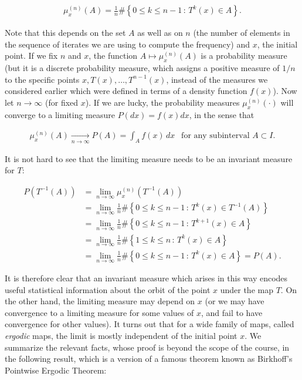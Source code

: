 \documentclass[11pt]{report}
\theoremstyle{plain}
\theoremstyle{definition}
\begin{document}
\begin{align*}
\mu_{x}^{(n)}(A) = \frac{1}{n} \# \left\{ 0\le k \le n-1\,:\, T^k(x) \in A \right\}.
\end{align*}

\noindent Note that this depends on the set $A$ as well as on
$n$ (the number of elements in the sequence of
iterates we are using to compute the frequency) and
$x$, the initial point. If we fix $n$ and $x$, the
function $A\mapsto \mu_x^{(n)}(A)$ is a probability
measure (but it is a discrete probability measure,
which assigns a positive measure of $1/n$ to the
specific points $x,T(x),\ldots,T^{n-1}(x)$, instead of
the measures we considered earlier which were defined
in terms of a density function $f(x)$). Now let
$n\to\infty$ (for fixed $x$). If we are lucky, the
probability measures $\mu_x^{(n)}(\cdot)$ will
converge to a limiting measure $P(dx)=f(x)dx$, in the
sense that

\begin{align*}
\mu_x^{(n)}(A) \xrightarrow[n\to\infty]{} P(A) = \int_A f(x)\,dx \ \ \textrm{ for any subinterval }A\subset I.
\end{align*}

\noindent It is not hard to see that the limiting measure needs
to be an invariant measure for $T$:

\begin{align*}
P(T^{-1}(A)) &= \lim_{n\to\infty} \mu_x^{(n)}(T^{-1}(A)) \\ &
= \lim_{n\to\infty} \frac{1}{n}\#\left\{ 0\le k\le n-1\,:\,T^k(x)\in T^{-1}(A) \right\} \\
&
= \lim_{n\to\infty} \frac{1}{n}\#\left\{ 0\le k\le n-1\,:\,T^{k+1}(x)\in A \right\} \\
&
= \lim_{n\to\infty} \frac{1}{n}\#\left\{ 1\le k\le n\,:\,T^{k}(x)\in A \right\} \\
&
= \lim_{n\to\infty} \frac{1}{n}\#\left\{ 0\le k\le n-1\,:\,T^{k}(x)\in A \right\} = P(A).
\end{align*}

\noindent It is therefore clear that an invariant measure which
arises in this way encodes useful statistical
information about the orbit of the point $x$ under the
map $T$. On the other hand, the limiting measure may
depend on $x$ (or we may have convergence to a
limiting measure for some values of $x$, and fail to
have convergence for other values). It turns out that
for a wide family of maps, called \emph{ergodic} maps, the
limit is mostly independent of the initial point $x$.
We summarize the relevant facts, whose proof is beyond
the scope of the course, in the following result,
which is a version of a famous theorem known as
Birkhoff's Pointwise Ergodic Theorem:
\end{document}
